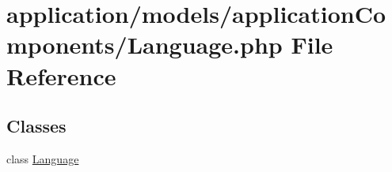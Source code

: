 \hypertarget{_language_8php}{\section{application/models/application\-Components/\-Language.php File Reference}
\label{_language_8php}
}
\subsection*{Classes}
\begin{DoxyCompactItemize}
\item 
class \hyperlink{class_language}{Language}
\end{DoxyCompactItemize}
